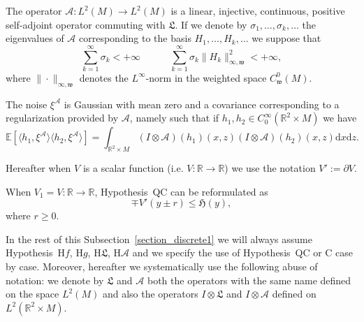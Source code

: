 \documentclass[a4paper,10pt]{article}
\newcommand{\mathd}{\mathrm{d}}
\begin{document}
{{  \item[Hypothesis~H$\mathcal{A}$.] The operator $\mathcal{A} : L^2 (M)
  \rightarrow L^2 (M)$ is a linear, injective, continuous, positive
  self-adjoint operator commuting with $\mathfrak{L}$. If we denote by
  $\sigma_1, \ldots, \sigma_k, \ldots$ the eigenvalues of $\mathcal{A}$
  corresponding to the basis $H_1, \ldots, H_k, \ldots$ we suppose that
  \[ \sum_{k = 1}^{\infty} \sigma_k < + \infty \hspace{3em} \sum_{k =
     1}^{\infty} \sigma_k \| H_k \|_{\infty, \mathfrak{w}}^2 < + \infty, \]
  where $\| \cdot \|_{\infty, \mathfrak{w}}$ denotes the $L^{\infty}$-norm in
  the weighted space $C^0_{\mathfrak{w}} (M)$.
  
  \item[Hypothesis~H$\xi$.] The noise $\xi^{\mathcal{A}}$ is Gaussian with
  mean zero and a covariance corresponding to a regularization provided by
  $\mathcal{A}$, namely such that if $h_1, h_2 \in C^{\infty}_0 (\mathbb{R}^2
  \times M)$ we have
  \[ \mathbb{E} [\langle h_1, \xi^{\mathcal{A}} \rangle \langle h_2,
     \xi^{\mathcal{A}} \rangle] = \int_{\mathbb{R}^2 \times M} (I \otimes
     \mathcal{A}) (h_1) (x, z) (I \otimes \mathcal{A}) (h_2) (x, z) \mathd x
     \mathd z. \]
}}     
     
Hereafter when $V$ is a scalar function (i.e. $V:\mathbb{R} \rightarrow \mathbb{R}$) we use the notation $V':=\partial V$.
     
\begin{remark}
  When $V_1 = V : \mathbb{R} \rightarrow \mathbb{R}$, Hypothesis~QC can be
  reformulated as
  \[ \mp V' (y \pm r) \leqslant \mathfrak{H} (y), \]
  where $r \geqslant 0$.
\end{remark}

In the rest of this Subsection~\ref{section_discrete1} we will always assume
Hypothesis~H$f$, H$g$, H$\mathfrak{L}$, H$\mathcal{A}$ and we specify the use
of Hypothesis~QC or C case by case. Moreover, hereafter we systematically use
the following abuse of notation: we denote by $\mathfrak{L}$ and $\mathcal{A}$
both the operators with the same name defined on the space $L^2 (M)$ and also
the operators $I \otimes \mathfrak{L}$ and $I \otimes \mathcal{A}$ defined on
$L^2 (\mathbb{R}^2 \times M)$.

\
\end{document}
